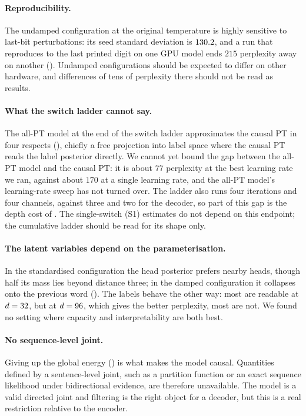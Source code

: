 \paragraph{Reproducibility.}
The undamped configuration at the original temperature is highly sensitive to last-bit
perturbations: its seed standard deviation is $130.2$, and a run that reproduces to
the last printed digit on one GPU model ends $215$ perplexity away on another
(). Undamped configurations should be expected to differ on other hardware,
and differences of tens of perplexity there should not be read as results.

\paragraph{What the switch ladder cannot say.}
The all-PT model at the end of the switch ladder approximates the causal PT in four respects
(), chiefly a free projection into label space where the causal PT reads
the label posterior directly. We cannot yet bound the gap between the all-PT model and the
causal PT: it is about $77$ perplexity at the best learning rate we ran, against about $170$ at
a single learning rate, and the all-PT model's learning-rate sweep has not turned over. The
ladder also runs four iterations and four channels, against three and two for the decoder, so
part of this gap is the depth cost of . The single-switch (S1) estimates do
not depend on this endpoint; the cumulative ladder should be read for its shape only.

\paragraph{The latent variables depend on the parameterisation.}
In the standardised configuration the head posterior prefers nearby heads, though half its mass
lies beyond distance three; in the damped configuration it collapses onto the previous word
(). The labels behave the other way: most are readable at
$d=32$, but at $d=96$, which gives the better perplexity, most are not. We found no
setting where capacity and interpretability are both best.

\paragraph{No sequence-level joint.}
Giving up the global energy () is what makes the model causal. Quantities
defined by a sentence-level joint, such as a partition function or an exact sequence likelihood
under bidirectional evidence, are therefore unavailable. The model is a valid directed joint and
filtering is the right object for a decoder, but this is a real restriction relative to the
encoder.
